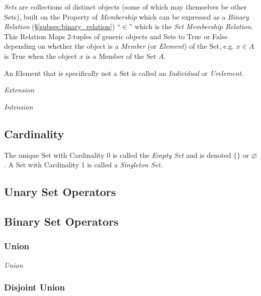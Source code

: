 \documentclass{article}
\begin{document}
\emph{Sets} are collections of distinct objects (some of which may
themselves be other Sets), built on the Property of \emph{Membership}
which can be expressed as a \emph{Binary Relation}
(\S\ref{subsec:binary_relation}) ``$\in$'' which is the \emph{Set
  Membership Relation}. This Relation Maps 2-tuples of generic objects
and Sets to True or False depending on whether the object is a
\emph{Member} (or \emph{Element}) of the Set, e.g. $x \in A$ is True
when the object $x$ is a Member of the Set $A$.

An Element that is specifically not a Set is called an
\emph{Individual} or \emph{Urelement}.

\emph{Extension}

\emph{Intension}

\subsection{Cardinality}

The unique Set with Cardinality 0 is called the \emph{Empty Set} and
is denoted $\{\}$ or $\varnothing$. A Set with Cardinality 1 is called a
\emph{Singleton Set}.

\subsection{Unary Set Operators}

\subsection{Binary Set Operators}

\subsubsection{Union}

\emph{Union}

\subsubsection{Disjoint Union}\label{subsec:disjoint_union}
\end{document}
